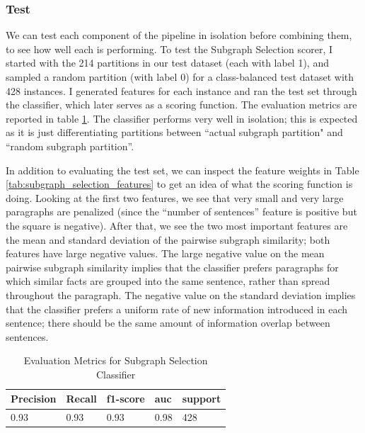 \documentclass[12pt]{article}
\begin{document}
\subsubsection{Test}

We can test each component of the pipeline in isolation before combining them, to see how well each is performing. To test the Subgraph Selection scorer, I started with the 214 partitions in our test dataset (each with label 1), and sampled a random partition (with label 0) for a class-balanced test dataset with 428 instances. I generated features for each instance and ran the test set through the classifier, which later serves as a scoring function. The evaluation metrics are reported in table \ref{tab:subgraph_selection_eval}. The classifier performs very well in isolation; this is expected as it is just differentiating partitions between ``actual subgraph partition" and ``random subgraph partition''.

In addition to evaluating the test set, we can inspect the feature weights in Table \ref{tab:subgraph_selection_features} to get an idea of what the scoring function is doing. Looking at the first two features, we see that very small and very large paragraphs are penalized (since the ``number of sentences'' feature is positive but the square is negative). After that, we see the two most important features are the mean and standard deviation of the pairwise subgraph similarity; both features have large negative values. The large negative value on the mean pairwise subgraph similarity implies that the classifier prefers paragraphs for which similar facts are grouped into the same sentence, rather than spread throughout the paragraph. The negative value on the standard deviation implies that the classifier prefers a uniform rate of new information introduced in each sentence; there should be the same amount of information overlap between sentences.

\begin{table}[H]
\centering
\caption{Evaluation Metrics for Subgraph Selection Classifier}
\label{tab:subgraph_selection_eval}
\begin{tabular}{@{}lllll@{}}
\toprule
\textbf{Precision} & \textbf{Recall} & \textbf{f1-score} & \textbf{auc} & \textbf{support} \\ \midrule
0.93               & 0.93            & 0.93              & 0.98         & 428              \\ \bottomrule
\end{tabular}
\end{table}
\end{document}
